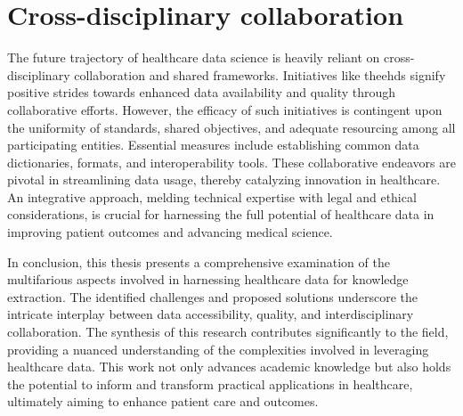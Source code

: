 \section{Cross-disciplinary collaboration}
The future trajectory of healthcare data science is heavily reliant on cross-disciplinary collaboration and shared frameworks. Initiatives like the\ac{ehds} signify positive strides towards enhanced data availability and quality through collaborative efforts. However, the efficacy of such initiatives is contingent upon the uniformity of standards, shared objectives, and adequate resourcing among all participating entities. Essential measures include establishing common data dictionaries, formats, and interoperability tools. These collaborative endeavors are pivotal in streamlining data usage, thereby catalyzing innovation in healthcare. An integrative approach, melding technical expertise with legal and ethical considerations, is crucial for harnessing the full potential of healthcare data in improving patient outcomes and advancing medical science.


In conclusion, this thesis presents a comprehensive examination of the multifarious aspects involved in harnessing healthcare data for knowledge extraction. The identified challenges and proposed solutions underscore the intricate interplay between data accessibility, quality, and interdisciplinary collaboration. The synthesis of this research contributes significantly to the field, providing a nuanced understanding of the complexities involved in leveraging healthcare data. This work not only advances academic knowledge but also holds the potential to inform and transform practical applications in healthcare, ultimately aiming to enhance patient care and outcomes.


